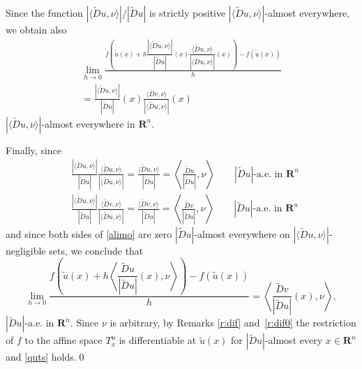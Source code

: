 \documentclass{article}
\theoremstyle{definition}
\theoremstyle{remark}
\newcommand{\wt}{\widetilde}
\newcommand{\envert}[1]{\left\lvert#1\right\rvert}
\let\abs=\envert
\begin{document}
Since the function $\abs{\langle \wt{D}u,\nu\rangle }/\abs{\wt{D}u}$
is strictly positive $\abs{\langle \wt{D}u,\nu\rangle }$-almost everywhere,
we obtain also
\begin{multline*}
\lim_{h\to 0}\frac{f(\tilde u(x)+h\dfrac{\abs{\langle
\wt{D}u,\nu\rangle }}{\abs{\wt{D}u}}(x)\dfrac{\langle \wt{D}
u,\nu\rangle }{\abs{\langle \wt{D}u,\nu\rangle }}(x))-f(\tilde u(x))}{h}\\
=\frac{\abs{\langle \wt{D}u,\nu\rangle }}{\abs{\wt{D}u}}(x)\frac
{\langle \wt{D}v,\nu\rangle }{\abs{\langle
\wt{D}u,\nu\rangle }}(x)
\end{multline*}
$\abs{\langle \wt{D}u,\nu\rangle }$-almost everywhere in $\mathbf{R}^n$.

Finally, since
\begin{align*}
&\frac{\abs{\langle \wt{D}u,\nu\rangle }}{\abs{\wt{D}u}}
\frac{\langle \wt{D}u,\nu\rangle }{\abs{\langle \wt{D}u,\nu\rangle}}
=\frac{\langle \wt{D}u,\nu\rangle }{\abs{\wt{D}u}}
=\left\langle \frac{\wt{D}u}{\abs{\wt{D}u}},\nu\right\rangle
        \qquad\abs{\wt{D}u}\text{-a.e. in }\mathbf{R}^n\\
&\frac{\abs{\langle \wt{D}u,\nu\rangle }}{\abs{\wt{D}u}}
\frac{\langle \wt{D}v,\nu\rangle }{\abs{\langle \wt{D}u,\nu\rangle}}
=\frac{\langle \wt{D}v,\nu\rangle }{\abs{\wt{D}u}}
=\left\langle \frac{\wt{D}v}{\abs{\wt{D}u}},\nu\right\rangle
        \qquad\abs{\wt{D}u}\text{-a.e. in }\mathbf{R}^n
\end{align*}
and since both sides of \eqref{alimo}
are zero $\abs{\wt{D}u}$-almost everywhere
on $\abs{\langle \wt{D}u,\nu\rangle }$-negligible sets, we conclude that
\[
\lim_{h\to 0}\frac{f\left(
\tilde u(x)+h\left\langle \dfrac{\wt{D}
u}{\abs{\wt{D}u}}(x),\nu\right\rangle \right)-f(\tilde u(x))}h
=\left\langle \frac{\wt{D}v}{\abs{\wt{D}u}}(x),\nu\right\rangle,
\]
$\abs{\wt{D}u}$-a.e. in $\mathbf{R}^n$.
Since $\nu$ is arbitrary, by Remarks \ref{r:dif} and~\ref{r:dif0}
the restriction of $f$ to
the affine space $T^u_x$ is differentiable at $\tilde u(x)$ for $\abs{\wt{D}
u}$-almost every $x\in \mathbf{R}^n$ and \eqref{quts} holds.\qed
\end{document}
